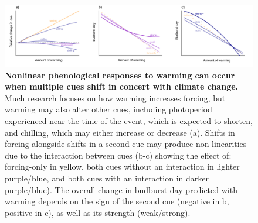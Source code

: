 \documentclass[11pt,letter]{article}
\begin{document}
\begin{figure}
\centering
\includegraphics[width=1.1\textwidth]{..//..//analyses/limitingcues/figures/intxnsims2021photoaltwithchill_3panels_sm.pdf} %
\caption{{\bf Nonlinear phenological responses to warming can occur when multiple cues shift in concert with climate change.} Much research focuses on how warming increases forcing, but warming may also alter other cues, including photoperiod experienced near the time of the event, which is expected to shorten, and chilling, which may either increase or decrease (a). Shifts in forcing alongside shifts in a second cue may produce non-linearities due to the interaction between cues (b-c) showing the effect of: forcing-only in yellow, both cues without an interaction in lighter purple/blue, and both cues with an interaction in darker purple/blue). The overall change in budburst day predicted with warming depends on the sign of the second cue (negative in b, positive in c), as well as its strength (weak/strong).}
  \label{fig:intxncues}
\end{figure}
\end{document}
